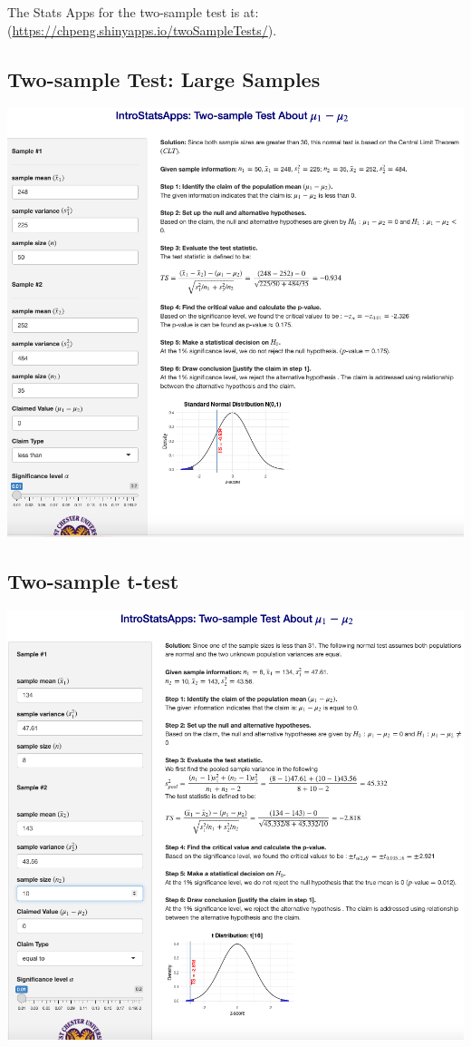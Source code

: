 \documentclass[
]{book}
\begin{document}
The Stats Apps for the two-sample test is at: (\url{https://chpeng.shinyapps.io/twoSampleTests/}).

\hypertarget{two-sample-test-large-samples}{%
\subsection{Two-sample Test: Large Samples}\label{two-sample-test-large-samples}}

\includegraphics[width=1\linewidth]{week11/tech01}

\hypertarget{two-sample-t-test}{%
\subsection{Two-sample t-test}\label{two-sample-t-test}}

\begin{center}\includegraphics[width=1\linewidth]{week11/tech02} \end{center}
\end{document}

